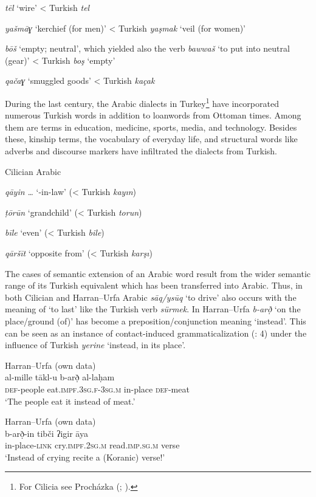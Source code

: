 \documentclass[output=paper]{langsci/langscibook}
\begin{document}
\textit{tēl} ‘wire’ < Turkish \textit{tel}

\textit{yašmāɣ} ‘kerchief (for men)’ < Turkish \textit{yaşmak} ‘veil (for women)’

\textit{bōš} ‘empty; neutral’, which yielded also the verb \textit{bawwaš} ‘to put into neutral (gear)’ < Turkish \textit{boş} ‘empty’

\textit{qačaɣ} ‘smuggled goods’ < Turkish \textit{kaçak}
\z

During the last century, the Arabic dialects in Turkey\footnote{For Cilicia see Procházka (\citeyear{Procházka2002Cukurova}; \citeyear[187--199]{Procházka2002Adana}).} have incorporated numerous Turkish words in addition to loanwords from Ottoman times. Among them are terms in education, medicine, sports, media, and technology. Besides these, kinship terms, the vocabulary of everyday life, and structural words like adverbs and discourse markers have infiltrated the dialects from Turkish. 

\ea
Cilician Arabic

\textit{qāyin} \textit{…} ‘-in-law’ (< Turkish \textit{kayın})

\textit{ṭōrūn} ‘grandchild’ (< Turkish \textit{torun})

\textit{bīle} ‘even’ (< Turkish \textit{bile})

\textit{qāršīt} ‘opposite from’ (< Turkish \textit{karşı})
\z

The cases of semantic extension of an Arabic word result from the wider semantic range of its Turkish equivalent which has been transferred into Arabic. Thus, in both Cilician and Harran--Urfa Arabic \textit{sāq/ysūq} ‘to drive’ also occurs with the meaning of ‘to last’ like the Turkish verb \textit{sürmek}. In Harran--Urfa \textit{b-arð̣} ‘on the place/ground (of)’ has become a preposition/conjunction meaning ‘instead’. This can be seen as an instance of contact-induced grammaticalization (\citealt{GardaniArkadievAmiridze2015}: 4) under the influence of Turkish \textit{yerine} ‘instead, in its place’.

\ea
{Harran--Urfa (own data)}\\
 \gll   al-mille tākl-u b-arð̣ al-laḥam\\
     \textsc{def}{}-people eat.\textsc{impf.3sg.f-3sg.m}  in-place \textsc{def}{}-meat\\
\glt  ‘The people eat it instead of meat.’
\z

\ea\label{ex:prochazka:} 
{Harran--Urfa (own data)}\\
\gll    b-arð̣-in tibči ʔigir āya\\
     in-place-\textsc{link} cry.\textsc{impf.2sg.m} read.\textsc{imp.sg.m} verse\\
\glt ‘Instead of crying recite a (Koranic) verse!’
\z
\end{document}
